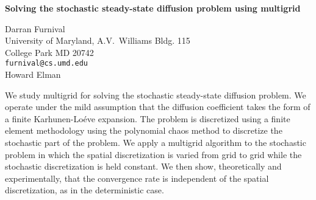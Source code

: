 \documentclass{report}
\begin{document}

\begin{center}
{\large
{\bf Solving the stochastic steady-state diffusion problem using multigrid}}

	Darran Furnival \\
	University of Maryland, A.V.~Williams Bldg. 115 \\
	College Park MD 20742 \\
	{\tt furnival@cs.umd.edu} \\
	Howard Elman
\end{center}
We study multigrid for solving the stochastic steady-state
diffusion problem. We operate under the mild assumption that
the diffusion coefficient takes the form of a finite
Karhunen-Lo\'eve expansion. The problem is discretized using
a finite element methodology using the polynomial chaos
method to discretize the stochastic part of the problem. We
apply a multigrid algorithm to the stochastic problem in
which the spatial discretization is varied from grid to grid
while the stochastic discretization is held constant. We
then show, theoretically and experimentally, that the
convergence rate is independent of the spatial
discretization, as in the deterministic case.



\end{document}
